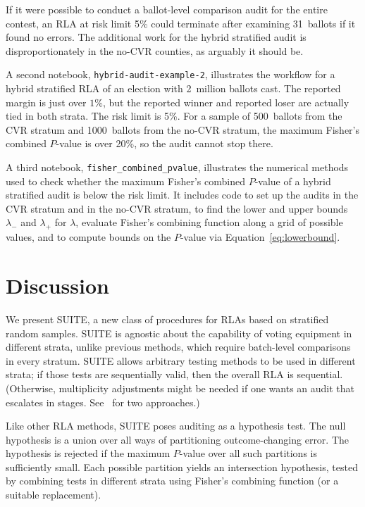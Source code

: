 \documentclass[runningheads]{llncs}
\begin{document}
If it were possible to conduct a ballot-level comparison audit for the entire contest, 
an RLA at risk limit 5\% could terminate after examining 31~ballots if it found no errors.
The additional work for the hybrid stratified audit is disproportionately in the no-CVR counties, as
arguably it should be.

A second notebook, \texttt{hybrid-audit-example-2}, illustrates the 
workflow for a hybrid stratified RLA of an election with 2~million ballots cast.
The reported margin is just over $1\%$, but the reported winner
and reported loser are actually tied in both strata.  
The risk limit is 5\%.
For a sample of 500~ballots from the CVR stratum and 1000~ballots from the no-CVR stratum, the maximum Fisher's combined $P$-value is over 20\%, so the audit cannot stop there.

A third notebook, \texttt{fisher\_combined\_pvalue}, illustrates the numerical methods used
to check whether the maximum Fisher's combined $P$-value of a hybrid stratified audit is below the risk limit.
It includes code to set up the audits in the CVR stratum and in the no-CVR stratum,
 to find the lower and upper bounds $\lambda_-$ and $\lambda_+$ for $\lambda$,
 evaluate Fisher's combining function along a grid of possible values,
and to compute bounds on the $P$-value via Equation~\ref{eq:lowerbound}.

\section{Discussion} \label{sec:discussion}

We present SUITE, a new class of procedures for RLAs based on stratified random samples.
SUITE is agnostic about the capability of voting equipment in different strata, unlike
previous methods, which require batch-level comparisons in every stratum.
SUITE allows arbitrary testing methods to be used in different strata; if those tests are sequentially valid, then the overall RLA is sequential. 
(Otherwise, multiplicity adjustments might be needed if one wants an audit that escalates in stages.
See~\cite{stark08a,stark09a} for two approaches.)

Like other RLA methods, SUITE poses auditing as a hypothesis test.
The null hypothesis is a union over all ways of partitioning outcome-changing error.
The hypothesis is rejected if the maximum $P$-value over all such partitions is sufficiently
small.
Each possible partition yields an intersection hypothesis, tested by
combining tests in different strata using Fisher's combining function (or a suitable
replacement). 
\end{document}
